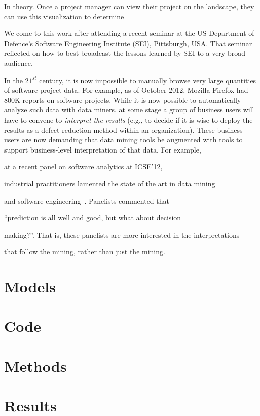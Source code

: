 \documentclass[runningheads]{llncs}
\begin{document}
In theory. Once a project manager can view their project on the landscape,
they can use this visualization to determine

We come to this work after attending a recent seminar at the US 
Department of Defence's Software Engineering Institute (SEI), Pittsburgh, USA.
That seminar reflected on how to best broadcast the lessons learned by SEI
to a very broad audience.

In the $21^{st}$ century, it is now impossible to manually browse very
large quantities of software project data.
For example, as of October 2012,
Mozilla Firefox had 800K reports on software projects.  While it is
now possible to automatically analyze such data with data miners, at
some stage a group of business users will have to convene to {\em
  interpret the results} (e.g., to decide if it is wise to deploy the
results as a defect reduction method within an organization).
These business  users are now demanding that data mining tools
be augmented with tools to support  business-level
interpretation of that data. For example,

at a recent panel on software analytics at ICSE'12,

industrial practitioners lamented the state of the art in data mining

and software engineering~\cite{menzies12a}. Panelists commented that

``prediction is all well and good, but what about decision

making?''. That is, these panelists are more interested in the interpretations

that follow the mining, rather than just  the mining.



\section{Models}


\section{Code}


\section{Methods}

\section{Results}

\end{document}
